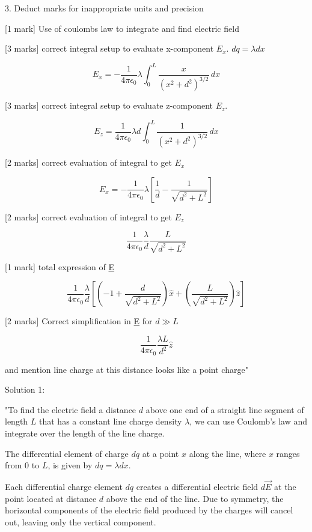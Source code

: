 3. Deduct marks for inappropriate units and precision

[1 mark] Use of coulombs law to integrate and find electric field

[3 marks] correct integral setup to evaluate x-component \( E_x \). \( dq = \lambda dx \)

\[ E_x = - \frac{1}{4\pi \epsilon_0} \lambda \int_{0}^{L} \frac{x}{(x^2+d^2)^{3/2}} \, dx \]

[3 marks] correct integral setup to evaluate z-component \( E_z \).

\[ E_z = \frac{1}{4\pi \epsilon_0} \lambda d  \int_{0}^{L} \frac{1}{(x^2+d^2)^{3/2}} \, dx \]

[2 marks] correct evaluation of integral to get \( E_x \)

\[ E_x = -\frac{1}{4 \pi \epsilon_0} \lambda \left [ \frac{1}{d} - \frac{1}{\sqrt{d^2+L^2}} \right ] \]

[2 marks] correct evaluation of integral to get \( E_z \)

\[ \frac{1}{4 \pi \epsilon_0} \frac{\lambda}{d} \frac{L}{\sqrt{d^2+L^2}} \]

[1 mark] total expression of \underline{E}

\[
\frac{1}{4 \pi \epsilon_0} \frac{\lambda}{d} \left [ \left ( -1+\frac{d}{\sqrt{d^2+L^2}} \right ) \hat{x} +\left ( \frac{L}{\sqrt{d^2+L^2}} \right ) \hat{z} \right ]
\]

[2 marks] Correct simplification in \underline{E} for \( d \gg L \)

\[ \frac{1}{4 \pi \epsilon_0} \frac{\lambda L}{d^2} \hat{z} \]

and mention line charge at this distance looks like a point charge"

Solution 1:

"To find the electric field a distance \( d \) above one end of a straight line segment of length \( L \) that has a constant line charge density \( \lambda \), we can use Coulomb's law and integrate over the length of the line charge.

The differential element of charge \( dq \) at a point \( x \) along the line, where \( x \) ranges from 0 to \( L \), is given by \( dq = \lambda dx \).

Each differential charge element \( dq \) creates a differential electric field \( d\vec{E} \) at the point located at distance \( d \) above the end of the line. Due to symmetry, the horizontal components of the electric field produced by the charges will cancel out, leaving only the vertical component.

